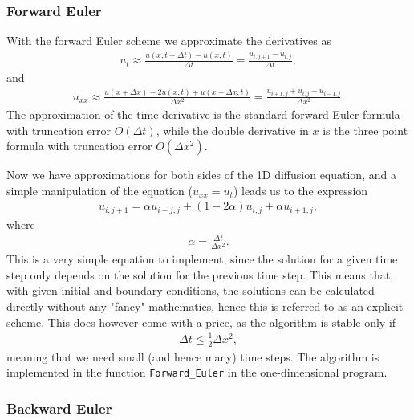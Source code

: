 \documentclass[12pt, a4paper]{article}
\begin{document}
\subsubsection{Forward Euler}

With the forward Euler scheme we approximate the derivatives as  
\begin{align*}
u_t \approx \frac{u(x,t+\Delta t) - u(x,t)}{\Delta t} = \frac{u_{i,j+1}- u_{i,j}}{\Delta t}, 
\end{align*}
and 
\begin{align*}
u_{xx} \approx \frac{u(x+\Delta x) - 2 u(x,t) + u(x-\Delta x,t)}{\Delta x^2} 
			=  \frac{u_{i+1,j} + u_{i,j} - u_{i-1,j}}{\Delta x^2}. 
\end{align*}
The approximation of the time derivative is the standard forward Euler formula with truncation error 
$O(\Delta t)$, while the double derivative in $x$ is the three point formula with truncation error 
$O(\Delta x^2)$. 

Now we have approximations for both sides of the 1D diffusion equation, and a simple manipulation of 
the equation ($u_{xx} = u_t$) leads us to the expression 
\begin{align}
u_{i,j+1} = \alpha u_{i-j,j} + (1-2\alpha)u_{i,j} + \alpha u_{i+1,j},
\label{eq:FE}
\end{align}
where 
\begin{align*}
\alpha = \frac{\Delta t}{\Delta x^2}. 
\end{align*}
This is a very simple equation to implement, since the solution for a given time step only depends on 
the solution for the previous time step. This means that, with given initial and boundary conditions, 
the solutions can be calculated directly without any "fancy" mathematics, hence this is referred to as 
an explicit scheme. This does however come with a price, as the algorithm is stable only if 
\begin{align*}
\Delta t \leq \frac{1}{2} \Delta x^2, 
\end{align*}
meaning that we need small (and hence many) time steps. The algorithm is implemented in the function 
\texttt{Forward\_Euler} in the one-dimensional program. 

\subsubsection{Backward Euler}
\end{document}
